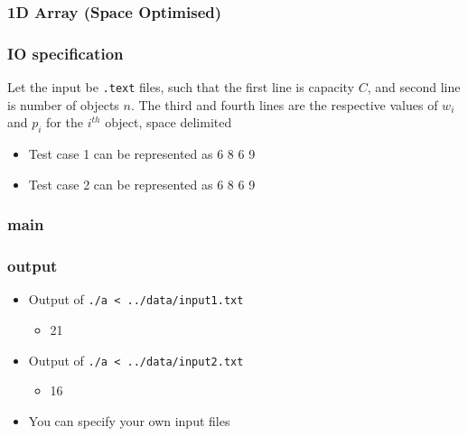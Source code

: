\documentclass{beamer}
\begin{document}
\begin{frame}
	\frametitle{1D Array (Space Optimised)}
  
\end{frame}

\begin{frame}
  \frametitle{IO specification}
  Let the input be \texttt{.text} files, such that the first line is capacity $C$, and second line is number of objects $n$. The third and fourth lines are the respective values of $w_i$ and $p_i$  for the $i^{th}$ object, space delimited
  \begin{itemize}
    \item Test case 1 can be represented as  6 8 6 9\newline
    \item Test case 2 can be represented as  6 8 6 9\newline
  \end{itemize}
\end{frame}

\begin{frame}
	\frametitle{main}
  
\end{frame}

\begin{frame}
  \frametitle{output}
  \begin{itemize}
    \item Output of \texttt{./a < ../data/input1.txt}
      \begin{itemize}
        \item 21
      \end{itemize}
    \item Output of \texttt{./a < ../data/input2.txt}
      \begin{itemize}
        \item 16 
      \end{itemize}
	 \item You can specify your own input files
  \end{itemize}
\end{frame}
\end{document}
